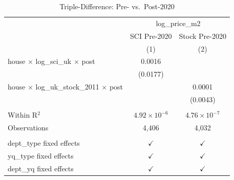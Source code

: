 
\begin{table}[htbp]
   \caption{\label{tab:prepost} Triple-Difference: Pre- vs.\ Post-2020}
   \bigskip
   \centering
   \begin{tabular}{lcc}
      \toprule
       & \multicolumn{2}{c}{log\_price\_m2}\\
                                                             & SCI Pre-2020          & Stock Pre-2020 \\   
                                                             & (1)                   & (2)\\  
      \midrule 
      house $\times$ log\_sci\_uk $\times$ post              & 0.0016                &   \\   
                                                             & (0.0177)              &   \\   
      house $\times$ log\_uk\_stock\_2011 $\times$ post      &                       & 0.0001\\   
                                                             &                       & (0.0043)\\   
       \\
      Within R$^2$                                           & $4.92\times 10^{-6}$  & $4.76\times 10^{-7}$\\   
      Observations                                           & 4,406                 & 4,032\\  
       \\
      dept\_type fixed effects                               & $\checkmark$          & $\checkmark$\\   
      yq\_type fixed effects                                 & $\checkmark$          & $\checkmark$\\   
      dept\_yq fixed effects                                 & $\checkmark$          & $\checkmark$\\   
      \bottomrule
   \end{tabular}
\end{table}


